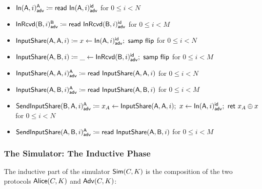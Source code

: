 \begin{itemize}
\item {\color{blue} $\LeakIn(\A,i)^\A_\adv \coloneqq \read{\LeakIn(\A,i)^\id_\adv}$ for $0 \leq i < N$}
\item {\color{blue} $\LeakInRcvd(\B,i)^\B_\adv \coloneqq \read{\LeakInRcvd(\B,i)^\id_\adv}$ for $0 \leq i < M$}\smallskip
\item $\InputShare(\A,\A,i) \coloneqq x \leftarrow \LeakIn(\A,i)^\id_\adv; \ \samp{\flip}$ for $0 \leq i < N$
\item $\InputShare(\A,\B,i) \coloneqq \_ \leftarrow \LeakInRcvd(\B,i)^\id_\adv; \ \samp{\flip}$ for $0 \leq i < M$\smallskip
\item {\color{blue} $\LeakInputShare(\A,\A,i)^\A_\adv \coloneqq \read{\InputShare(\A,\A,i)}$ for $0 \leq i < N$}
\item {\color{blue} $\LeakInputShare(\A,\B,i)^\A_\adv \coloneqq \read{\InputShare(\A,\B,i)}$ for $0 \leq i < M$}\smallskip
\item {\color{blue} $\LeakSendInputShare(\B,\A,i)^\A_\adv \coloneqq x_A \leftarrow \InputShare(\A,\A,i); \ x \leftarrow \LeakIn(\A,i)^\id_\adv; \ \ret{x_A \oplus x}$ for $0 \leq i < N$}
\item {\color{blue} $\LeakSendInputShare(\A,\B,i)^\A_\adv \coloneqq \read{\InputShare(\A,\B,i)}$ for $0 \leq i < M$}
\end{itemize}

\subsubsection{The Simulator: The Inductive Phase}
The inductive part of the simulator $\Sim(C,K)$ is the composition of the two protocols $\Alice(C,K)$ and $\Adv(C,K)$:

